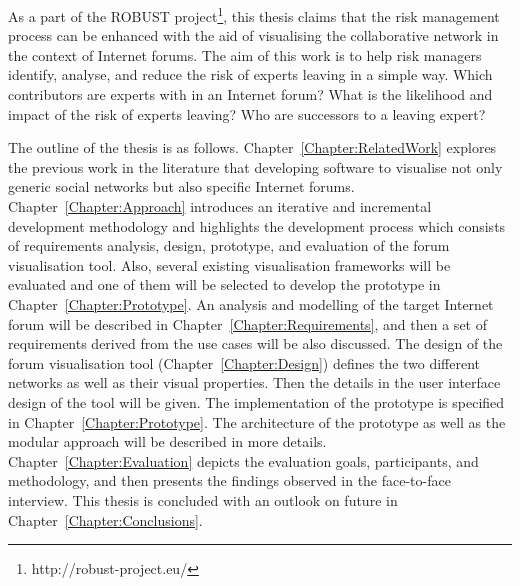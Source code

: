 As a part of the ROBUST project\footnote{http://robust-project.eu/}, this thesis claims that the risk management process can be enhanced with the aid of visualising the collaborative network in the context of Internet forums. The aim of this work is to help risk managers identify, analyse, and reduce the risk of experts leaving in a simple way. Which contributors are experts with in an Internet forum? What is the likelihood and impact of the risk of experts leaving? Who are successors to a leaving expert?

The outline of the thesis is as follows. Chapter~\ref{Chapter:RelatedWork} explores the previous work in the literature that developing software to visualise not only generic social networks but also specific Internet forums. Chapter~\ref{Chapter:Approach} introduces an iterative and incremental development methodology and highlights the development process which consists of requirements analysis, design, prototype, and evaluation of the forum visualisation tool. Also, several existing visualisation frameworks will be evaluated and one of them will be selected to develop the prototype in Chapter~\ref{Chapter:Prototype}. An analysis and modelling of the target Internet forum will be described in Chapter~\ref{Chapter:Requirements}, and then a set of requirements derived from the use cases will be also discussed. The design of the forum visualisation tool (Chapter~\ref{Chapter:Design}) defines the two different networks as well as their visual properties. Then the details in the user interface design of the tool will be given. The implementation of the prototype is specified in Chapter~\ref{Chapter:Prototype}. The architecture of the prototype as well as the modular approach will be described in more details. Chapter~\ref{Chapter:Evaluation} depicts the evaluation goals, participants, and methodology, and then presents the findings observed in the face-to-face interview.  This thesis is concluded with an outlook on future in Chapter~\ref{Chapter:Conclusions}.
